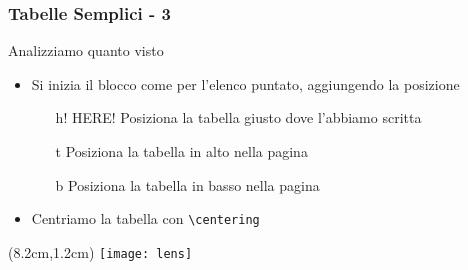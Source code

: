 \begin{frame}
  \frametitle{Tabelle Semplici - 3}
  
  Analizziamo quanto visto
  \begin{itemize}
   \item<2-> Si inizia il blocco come per l'elenco puntato, aggiungendo la 
posizione
   \begin{itemize}
    \item[h!] HERE! Posiziona la tabella giusto dove l'abbiamo scritta
    \item[t] Posiziona la tabella in alto nella pagina
    \item[b] Posiziona la tabella in basso nella pagina
   \end{itemize}

   \item<3-> Centriamo la tabella con \texttt{\textbackslash centering}
  \end{itemize}
  
  \begin{textblock*}{5cm}(8.2cm,1.2cm)
   \texttt{[image: lens]}
  \end{textblock*}

\end{frame}
